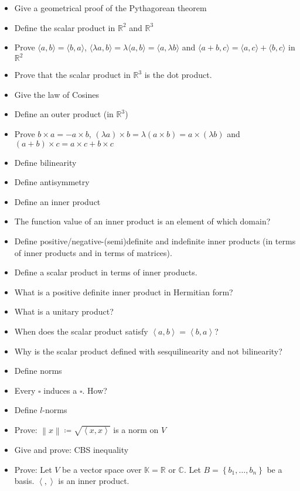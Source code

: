 \documentclass[a4paper]{article}
\newcommand{\set}[1]{\left\{#1\right\}}
\newcommand{\ip}[2]{\left\langle#1,#2\right\rangle} %
\newcommand{\angel}[1]{\left\langle#1\right\rangle}
\newcommand{\norm}[1]{\left\|#1\right\|}
\begin{document}
\begin{itemize}
  \item Give a geometrical proof of the Pythagorean theorem
  \item Define the scalar product in $\mathbb R^2$ and $\mathbb R^3$
  \item Prove $\langle a, b\rangle = \langle b, a\rangle$, $\langle \lambda a, b\rangle = \lambda \langle a, b\rangle = \langle a, \lambda b\rangle$ and $\langle a + b, c \rangle = \langle a, c \rangle + \langle b, c \rangle$ in $\mathbb R^2$
  \item Prove that the scalar product in $\mathbb R^3$ is the dot product.
  \item Give the law of Cosines
  \item Define an outer product (in $\mathbb R^3$)
  \item Prove $b \times a = -a \times b$, $(\lambda a) \times b = \lambda (a \times b) = a \times (\lambda b)$ and $(a + b) \times c = a \times c + b \times c$
  \item Define bilinearity
  \item Define antisymmetry
  \item Define an inner product
  \item The function value of an inner product is an element of which domain?
  \item Define positive/negative-(semi)definite and indefinite inner products (in terms of inner products and in terms of matrices).
  \item Define a scalar product in terms of inner products.
  \item What is a positive definite inner product in Hermitian form?
  \item What is a unitary product?
  \item When does the scalar product satisfy $\ip ab = \ip ba$?
  \item Why is the scalar product defined with sesquilinearity and not bilinearity?
  \item Define norms
  \item Every $\square{}$ induces a $\square{}$. How?
  \item Define $l$-norms
  \item Prove: $\norm{x} \coloneqq \sqrt{\angel{x, x}}$ is a norm on $V$
  \item Give and prove: CBS inequality
  \item Prove: Let $V$ be a vector space over $\mathbb K = \mathbb R$ or $\mathbb C$. Let $B = \set{b_1, \dots, b_n}$ be a basis. $\angel{,}$ is an inner product.

\end{itemize}
\end{document}
